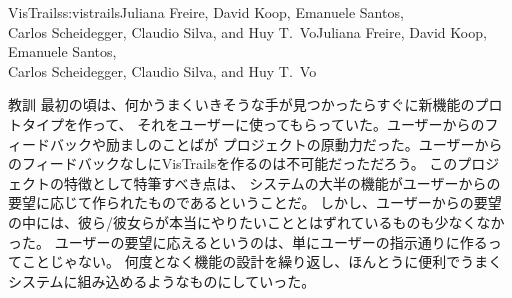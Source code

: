 \begin{aosachaptertoc}{VisTrails}{s:vistrails}{Juliana Freire, David Koop, Emanuele Santos, \\ Carlos Scheidegger, Claudio Silva, and Huy T.\ Vo}{Juliana Freire, David Koop, Emanuele Santos, \\ \hspace*{0.9cm} Carlos Scheidegger, Claudio Silva, and Huy T.\ Vo}
\begin{aosasect1}{教訓}
最初の頃は、何かうまくいきそうな手が見つかったらすぐに新機能のプロトタイプを作って、
それをユーザーに使ってもらっていた。ユーザーからのフィードバックや励ましのことばが
プロジェクトの原動力だった。ユーザーからのフィードバックなしにVisTrailsを作るのは不可能だっただろう。
このプロジェクトの特徴として特筆すべき点は、
システムの大半の機能がユーザーからの要望に応じて作られたものであるということだ。
しかし、ユーザーからの要望の中には、彼ら/彼女らが本当にやりたいこととはずれているものも少なくなかった。
ユーザーの要望に応えるというのは、単にユーザーの指示通りに作るってことじゃない。
何度となく機能の設計を繰り返し、ほんとうに便利でうまくシステムに組み込めるようなものにしていった。


\end{aosasect1}
\end{aosachaptertoc}
